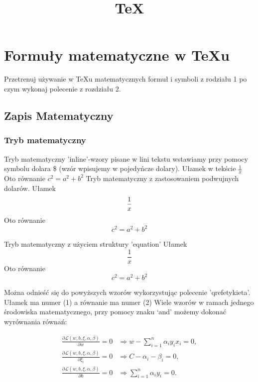 \documentclass[a4paper,12pt]{article}
\title{TeX}
\author{}
\begin{document}
\maketitle
\begin{abstract}

\end{abstract}

\section{Formuły matematyczne w TeXu}
Przetrenuj używanie w TeXu matematycznych formuł i symboli z rodziału 1 po czym 
wykonaj polecenie z rozdziału 2.                
\subsection{Zapis Matematyczny}
\subsubsection{Tryb matematyczny}
Tryb matematyczny 'inline'-wzory pisane w lini tekstu wstawiamy przy pomocy symbolu dolara \$
 (wzór wpisujemy w pojedyńcze dolary).\newline 
Ułamek w tekście $\frac{1}{x}$
Oto równanie $c^{2}=a^{2}+b^{2}$
\newline
Tryb matematyczny z zastosowaniem podwujnych dolarów.\newline
Ułamek 
$$\frac{1}{x}\\$$
Oto równanie 
$$c^{2}=a^{2}+b^{2}$$

Tryb matematyczny z użyciem struktury 'equation'\newline
Ułamek
\begin{equation}
\frac{1}{x}
\label{eq:rónanie1}
\end{equation}
Oto równanie
\begin{equation}
c^{2}=a^{2}+b^{2}
\label{eq:równanie2}
\end{equation}

Można odnieść się do powyższych wzorów wykorzystując polecenie 'qref{etykieta}'.
Ułamek ma numer (1) a równanie ma numer (2)
Wiele wzorów w ramach jednego środowiska matematycznego, przy pomocy znaku `and'
możemy dokonać wyrównania równań:

\begin{align}
\label{eq:partialLW}
\frac{\partial \mathcal L (w,b,\xi,\alpha,\beta)}{\partial w}=0 & \Rightarrow w 
-\sum_{i=1}^n\alpha_i y_i x_i=0,\\
\label{eq:partialLXi}
\frac{\partial \mathcal L (w,b,\xi,\alpha,\beta)}{\partial \xi_i}=0 & \Rightarrow
C-\alpha_i-\beta_i=0,\\
\label{eq:partialLB}
\frac{\partial \mathcal L (w,b,\xi,\alpha,\beta)}{\partial b}=0 & \Rightarrow 
\sum_{i=1}^n\alpha_i y_i=0.
\end{align}
\end{document}
